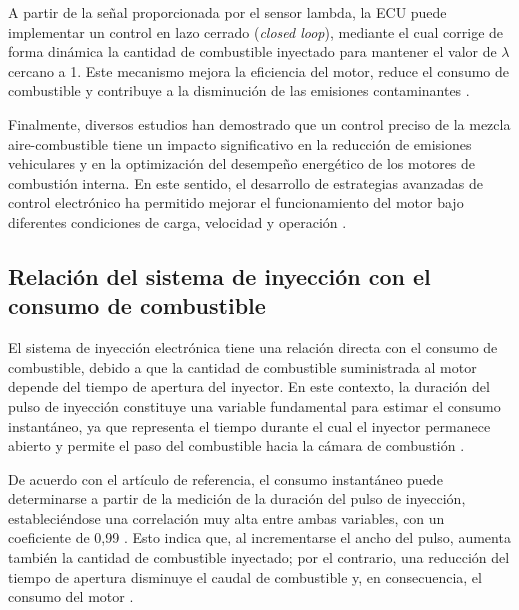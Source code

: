 A partir de la señal proporcionada por el sensor lambda, la ECU puede implementar un control en lazo cerrado (\textit{closed loop}), mediante el cual corrige de forma dinámica la cantidad de combustible inyectado para mantener el valor de $\lambda$ cercano a 1. Este mecanismo mejora la eficiencia del motor, reduce el consumo de combustible y contribuye a la disminución de las emisiones contaminantes \citep{Bosch_GDI}.

Finalmente, diversos estudios han demostrado que un control preciso de la mezcla aire-combustible tiene un impacto significativo en la reducción de emisiones vehiculares y en la optimización del desempeño energético de los motores de combustión interna. En este sentido, el desarrollo de estrategias avanzadas de control electrónico ha permitido mejorar el funcionamiento del motor bajo diferentes condiciones de carga, velocidad y operación \citep{Combustion_Emissions_2020}.

\subsection{Relación del sistema de inyección con el consumo de combustible}

El sistema de inyección electrónica tiene una relación directa con el consumo de combustible, debido a que la cantidad de combustible suministrada al motor depende del tiempo de apertura del inyector. En este contexto, la duración del pulso de inyección constituye una variable fundamental para estimar el consumo instantáneo, ya que representa el tiempo durante el cual el inyector permanece abierto y permite el paso del combustible hacia la cámara de combustión \citep{article2020fuelconsumption}.

De acuerdo con el artículo de referencia, el consumo instantáneo puede determinarse a partir de la medición de la duración del pulso de inyección, estableciéndose una correlación muy alta entre ambas variables, con un coeficiente de 0,99 \cite{article2020fuelconsumption}. Esto indica que, al incrementarse el ancho del pulso, aumenta también la cantidad de combustible inyectado; por el contrario, una reducción del tiempo de apertura disminuye el caudal de combustible y, en consecuencia, el consumo del motor \citep{article2020fuelconsumption}.

